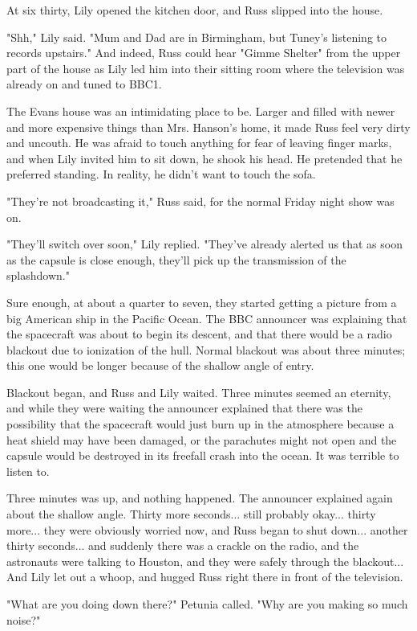 \documentclass[a4paper,11pt]{article}
\begin{document}
At six thirty, Lily opened the kitchen door, and Russ slipped into the house.

"Shh," Lily said. "Mum and Dad are in Birmingham, but Tuney's listening to records upstairs." And indeed, Russ could hear "Gimme Shelter" from the upper part of the house as Lily led him into their sitting room where the television was already on and tuned to BBC1.

The Evans house was an intimidating place to be. Larger and filled with newer and more expensive things than Mrs. Hanson's home, it made Russ feel very dirty and uncouth. He was afraid to touch anything for fear of leaving finger marks, and when Lily invited him to sit down, he shook his head. He pretended that he preferred standing. In reality, he didn't want to touch the sofa.

"They're not broadcasting it," Russ said, for the normal Friday night show was on.

"They'll switch over soon," Lily replied. "They've already alerted us that as soon as the capsule is close enough, they'll pick up the transmission of the splashdown."

Sure enough, at about a quarter to seven, they started getting a picture from a big American ship in the Pacific Ocean. The BBC announcer was explaining that the spacecraft was about to begin its descent, and that there would be a radio blackout due to ionization of the hull. Normal blackout was about three minutes; this one would be longer because of the shallow angle of entry.

Blackout began, and Russ and Lily waited. Three minutes seemed an eternity, and while they were waiting the announcer explained that there was the possibility that the spacecraft would just burn up in the atmosphere because a heat shield may have been damaged, or the parachutes might not open and the capsule would be destroyed in its freefall crash into the ocean. It was terrible to listen to.

Three minutes was up, and nothing happened. The announcer explained again about the shallow angle. Thirty more seconds... still probably okay... thirty more... they were obviously worried now, and Russ began to shut down... another thirty seconds... and suddenly there was a crackle on the radio, and the astronauts were talking to Houston, and they were safely through the blackout... And Lily let out a whoop, and hugged Russ right there in front of the television.

"What are you doing down there?" Petunia called. "Why are you making so much noise?"
\end{document}
